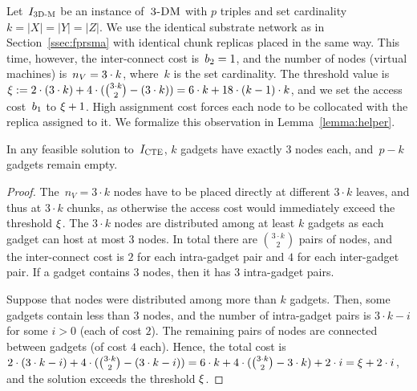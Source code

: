 Let~$I_{\mathrm{\textsc{3D-M}}}$ be an instance of~$\textsc{3-DM}$ with $p$ triples and set cardinality $k = |X| = |Y| = |Z|$.
We use the identical substrate network as in Section~\ref{ssec:fprsma} with
identical chunk replicas placed in the same way.
This time, however, the inter-connect cost is~$b_2 = 1$, and the number of nodes (virtual machines) is~$n_V = 3 \cdot k$, where~$k$ is the set cardinality.
The threshold value is $\xi :=  2\cdot (3\cdot k) + 4\cdot({ 3\cdot k \choose 2} - (3\cdot k)) = 6\cdot k + 18\cdot (k-1)\cdot k$, and we set the access cost~$b_1$ to $\xi + 1$.
High assignment cost forces each node to be collocated with the replica assigned to it.
We formalize this observation in Lemma~\ref{lemma:helper}.
\begin{lemma}\label{lemma:helper}
In any feasible solution to~$I_{\mathrm{\textsc{CTE}}}$, $k$ gadgets have exactly
$3$ nodes each, and~$p-k$ gadgets remain empty.
\end{lemma}
\begin{proof}
The~$n_V = 3\cdot k$ nodes have to be placed
directly at different $3\cdot k$ leaves, and thus at $3\cdot k$ chunks, as otherwise the access cost would immediately exceed the threshold $\xi$.
The $3\cdot k$ nodes are distributed among at least $k$ gadgets as each gadget can host at most $3$ nodes.
In total there are ${3\cdot k \choose 2}$ pairs of nodes,
and the inter-connect cost is $2$ for each intra-gadget pair and $4$ for each inter-gadget pair.
If a gadget contains $3$ nodes, then it has $3$ intra-gadget pairs.

Suppose that nodes were distributed among more than $k$ gadgets.
Then, some gadgets contain less than $3$ nodes, and the number of intra-gadget pairs is $3\cdot k - i$ for some $i>0$ (each of cost $2$).
The remaining pairs of nodes are connected between gadgets (of cost $4$ each).
Hence, the total cost is $2\cdot (3\cdot k - i) + 4 \cdot ({3 \cdot k \choose 2} - (3\cdot k - i)) = 6\cdot k + 4 \cdot ({3 \cdot k \choose 2} - 3\cdot k) + 2\cdot i = \xi + 2\cdot i$, and the solution exceeds the threshold $\xi$.
\end{proof}

